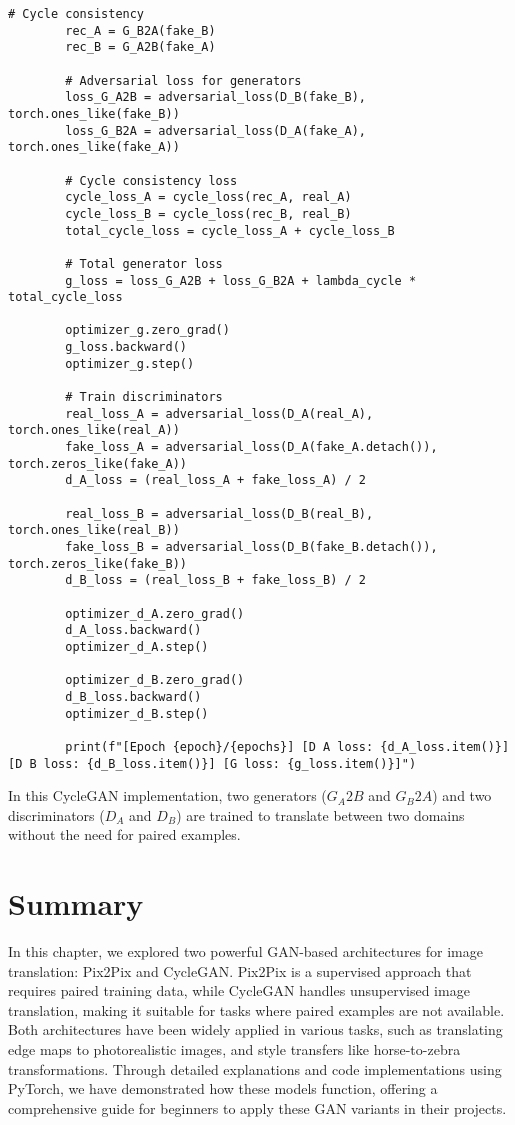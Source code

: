 \begin{lstlisting}[style=python]
        # Cycle consistency
        rec_A = G_B2A(fake_B)
        rec_B = G_A2B(fake_A)

        # Adversarial loss for generators
        loss_G_A2B = adversarial_loss(D_B(fake_B), torch.ones_like(fake_B))
        loss_G_B2A = adversarial_loss(D_A(fake_A), torch.ones_like(fake_A))

        # Cycle consistency loss
        cycle_loss_A = cycle_loss(rec_A, real_A)
        cycle_loss_B = cycle_loss(rec_B, real_B)
        total_cycle_loss = cycle_loss_A + cycle_loss_B

        # Total generator loss
        g_loss = loss_G_A2B + loss_G_B2A + lambda_cycle * total_cycle_loss

        optimizer_g.zero_grad()
        g_loss.backward()
        optimizer_g.step()

        # Train discriminators
        real_loss_A = adversarial_loss(D_A(real_A), torch.ones_like(real_A))
        fake_loss_A = adversarial_loss(D_A(fake_A.detach()), torch.zeros_like(fake_A))
        d_A_loss = (real_loss_A + fake_loss_A) / 2

        real_loss_B = adversarial_loss(D_B(real_B), torch.ones_like(real_B))
        fake_loss_B = adversarial_loss(D_B(fake_B.detach()), torch.zeros_like(fake_B))
        d_B_loss = (real_loss_B + fake_loss_B) / 2

        optimizer_d_A.zero_grad()
        d_A_loss.backward()
        optimizer_d_A.step()

        optimizer_d_B.zero_grad()
        d_B_loss.backward()
        optimizer_d_B.step()

        print(f"[Epoch {epoch}/{epochs}] [D A loss: {d_A_loss.item()}] [D B loss: {d_B_loss.item()}] [G loss: {g_loss.item()}]")
\end{lstlisting}
In this CycleGAN implementation, two generators ($G_A2B$ and $G_B2A$) and two discriminators ($D_A$ and $D_B$) are trained to translate between two domains without the need for paired examples.

\section{Summary}
In this chapter, we explored two powerful GAN-based architectures for image translation: Pix2Pix and CycleGAN. Pix2Pix is a supervised approach that requires paired training data, while CycleGAN handles unsupervised image translation, making it suitable for tasks where paired examples are not available. Both architectures have been widely applied in various tasks, such as translating edge maps to photorealistic images, and style transfers like horse-to-zebra transformations. Through detailed explanations and code implementations using PyTorch, we have demonstrated how these models function, offering a comprehensive guide for beginners to apply these GAN variants in their projects.










